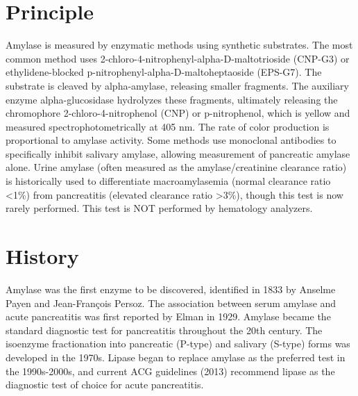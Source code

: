 \section*{Principle}
Amylase is measured by enzymatic methods using synthetic substrates. The most common method uses 2-chloro-4-nitrophenyl-alpha-D-maltotrioside (CNP-G3) or ethylidene-blocked p-nitrophenyl-alpha-D-maltoheptaoside (EPS-G7). The substrate is cleaved by alpha-amylase, releasing smaller fragments. The auxiliary enzyme alpha-glucosidase hydrolyzes these fragments, ultimately releasing the chromophore 2-chloro-4-nitrophenol (CNP) or p-nitrophenol, which is yellow and measured spectrophotometrically at 405 nm. The rate of color production is proportional to amylase activity. Some methods use monoclonal antibodies to specifically inhibit salivary amylase, allowing measurement of pancreatic amylase alone. Urine amylase (often measured as the amylase/creatinine clearance ratio) is historically used to differentiate macroamylasemia (normal clearance ratio <1\%) from pancreatitis (elevated clearance ratio >3\%), though this test is now rarely performed. This test is NOT performed by hematology analyzers.

\section*{History}
Amylase was the first enzyme to be discovered, identified in 1833 by Anselme Payen and Jean-Fran\c{c}ois Persoz. The association between serum amylase and acute pancreatitis was first reported by Elman in 1929. Amylase became the standard diagnostic test for pancreatitis throughout the 20th century. The isoenzyme fractionation into pancreatic (P-type) and salivary (S-type) forms was developed in the 1970s. Lipase began to replace amylase as the preferred test in the 1990s-2000s, and current ACG guidelines (2013) recommend lipase as the diagnostic test of choice for acute pancreatitis.

